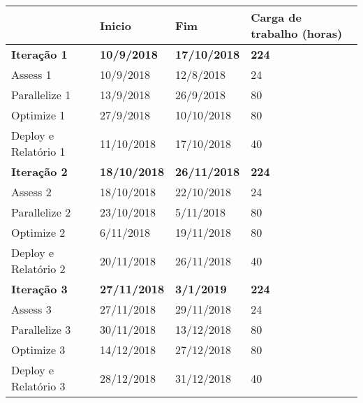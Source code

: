 \begin{table}[]
\begin{tabular}{|l|l|l|l|}
\hline
                                 & Inicio              & Fim                 & Carga de trabalho (horas) \\ \hline
\textbf{Iteração 1}              & \textbf{10/9/2018}  & \textbf{17/10/2018} & \textbf{224}              \\ \hline
Assess 1                         & 10/9/2018           & 12/8/2018           & 24                        \\ \hline
Parallelize 1                    & 13/9/2018           & 26/9/2018           & 80                        \\ \hline
Optimize 1                       & 27/9/2018           & 10/10/2018          & 80                        \\ \hline
Deploy e Relatório 1             & 11/10/2018          & 17/10/2018          & 40                        \\ \hline
\textbf{Iteração 2}              & \textbf{18/10/2018} & \textbf{26/11/2018} & \textbf{224}              \\ \hline
Assess 2                         & 18/10/2018          & 22/10/2018          & 24                        \\ \hline
Parallelize 2                    & 23/10/2018          & 5/11/2018           & 80                        \\ \hline
Optimize 2                       & 6/11/2018           & 19/11/2018          & 80                        \\ \hline
Deploy e Relatório 2             & 20/11/2018          & 26/11/2018          & 40                        \\ \hline
\textbf{Iteração 3}              & \textbf{27/11/2018} & \textbf{3/1/2019}   & \textbf{224}              \\ \hline
Assess 3                         & 27/11/2018          & 29/11/2018          & 24                        \\ \hline
Parallelize 3                    & 30/11/2018          & 13/12/2018          & 80                        \\ \hline
Optimize 3                       & 14/12/2018          & 27/12/2018          & 80                        \\ \hline
Deploy e Relatório 3             & 28/12/2018          & 31/12/2018          & 40                        \\ \hline

\end{tabular}
\end{table}
